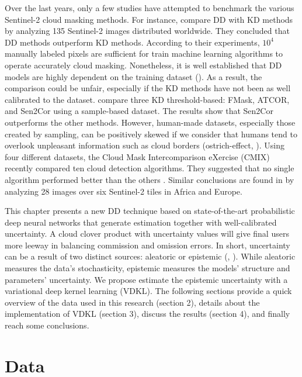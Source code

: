 \documentclass[a4paper, nobind]{templates/cdethesis}
\begin{document}
Over the last years, only a few studies have attempted to benchmark the various Sentinel-2 cloud masking methods. For instance, \cite{Cilli} compare DD with KD methods by analyzing 135 Sentinel-2 images distributed worldwide. They concluded that DD methods outperform KD methods. According to their experiments, \(10^{4}\) manually labeled pixels are sufficient for train machine learning algorithms to operate accurately cloud masking. Nonetheless, it is well established that DD models are highly dependent on the training dataset (\cite{Lopez-Puigdollers2021}). As a result, the comparison could be unfair, especially if the KD methods have not been as well calibrated to the dataset. \cite{Zekoll2021} compare three KD threshold-based: FMask, ATCOR, and Sen2Cor using a sample-based dataset. The results show that Sen2Cor outperforms the other methods. However, human-made datasets, especially those created by sampling, can be positively skewed if we consider that humans tend to overlook unpleasant information such as cloud borders (ostrich-effect, \cite{Valdez2017}). Using four different datasets, the Cloud Mask Intercomparison eXercise (CMIX) recently compared ten cloud detection algorithms. They suggested that no single algorithm performed better than the others \cite{skakun2022cloud}. Similar conclusions are found in \cite{tarrio2020comparison} by analyzing 28 images over six Sentinel-2 tiles in Africa and Europe.

This chapter presents a new DD technique based on state-of-the-art probabilistic deep neural networks that generate estimation together with well-calibrated uncertainty. A cloud clover product with uncertainty values will give final users more leeway in balancing commission and omission errors. In short, uncertainty can be a result of two distinct sources: aleatoric or epistemic (\cite{hora1996aleatory}, \cite{der2009aleatory}). While aleatoric measures the data's stochasticity, epistemic measures the models' structure and parameters' uncertainty. We propose estimate the epistemic uncertainty with a variational deep kernel learning (VDKL). The following sections provide a quick overview of the data used in this research (section 2), details about the implementation of VDKL (section 3), discuss the results (section 4), and finally reach some conclusions.

\hypertarget{data}{%
\section{Data}\label{data}}
\end{document}
